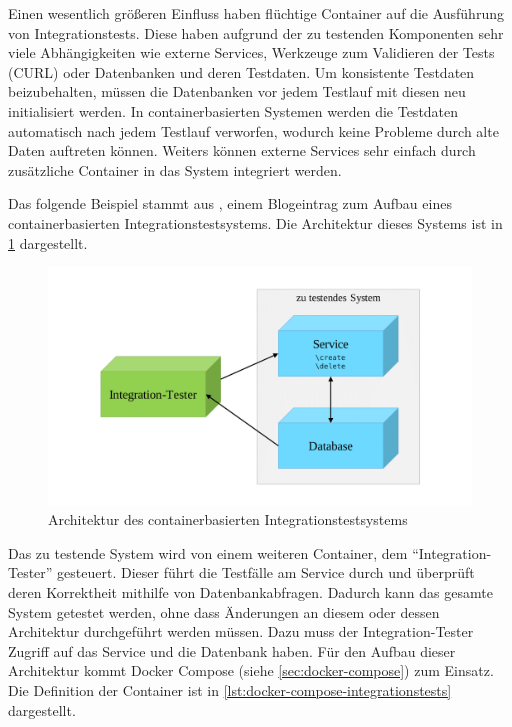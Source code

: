 Einen wesentlich größeren Einfluss haben flüchtige Container auf die Ausführung von Integrationstests.
Diese haben aufgrund der zu testenden Komponenten sehr viele Abhängigkeiten wie externe Services, Werkzeuge zum Validieren der Tests (CURL) oder Datenbanken und deren Testdaten.
Um konsistente Testdaten beizubehalten, müssen die Datenbanken vor jedem Testlauf mit diesen neu initialisiert werden.
In containerbasierten Systemen werden die Testdaten automatisch nach jedem Testlauf verworfen, wodurch keine Probleme durch alte Daten auftreten können.
Weiters können externe Services sehr einfach durch zusätzliche Container in das System integriert werden.

Das folgende Beispiel stammt aus \autocite{docker-integration-testing:online}, einem Blogeintrag zum Aufbau eines containerbasierten Integrationstestsystems. Die Architektur dieses Systems ist in \cref{fig:containerbasierte-integrationstests} dargestellt.

\begin{figure}[htbp]
    \centering
    \includegraphics[width=0.7\linewidth,clip,trim=100 30 100 30]{images/containerbasierte-integrationstests}
    \caption{Architektur des containerbasierten Integrationstestsystems}
\label{fig:containerbasierte-integrationstests}
\end{figure}

\noindent Das zu testende System wird von einem weiteren Container, dem "`Integration-Tester"' gesteuert.
Dieser führt die Testfälle am Service durch und überprüft deren Korrektheit mithilfe von Datenbankabfragen.
Dadurch kann das gesamte System getestet werden, ohne dass Änderungen an diesem oder dessen Architektur durchgeführt werden müssen.
Dazu muss der Integration-Tester Zugriff auf das Service und die Datenbank haben.
Für den Aufbau dieser Architektur kommt Docker Compose (siehe \cref{sec:docker-compose}) zum Einsatz.
Die Definition der Container ist in \cref{lst:docker-compose-integrationstests} dargestellt.

